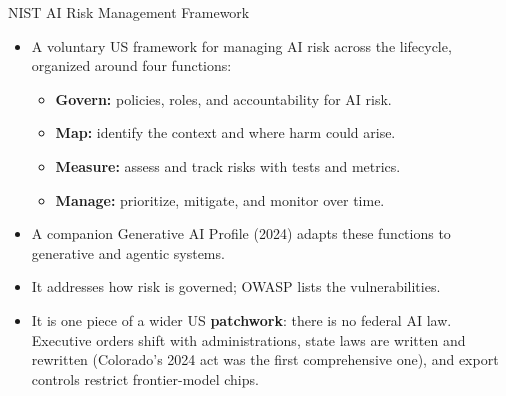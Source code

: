 \begin{frame}{NIST AI Risk Management Framework}
  \begin{itemize}\itemsep0.5em
    \item[\textcolor{KAred}{$\blacktriangleright$}] A voluntary US framework for managing AI risk across the lifecycle, organized around four functions:
      \begin{itemize}\itemsep0.25em
        \item \textbf{Govern:} policies, roles, and accountability for AI risk.
        \item \textbf{Map:} identify the context and where harm could arise.
        \item \textbf{Measure:} assess and track risks with tests and metrics.
        \item \textbf{Manage:} prioritize, mitigate, and monitor over time.
      \end{itemize}
    \item[\textcolor{KAred}{$\blacktriangleright$}] A companion Generative AI Profile (2024) adapts these functions to generative and agentic systems.
    \item[\textcolor{KAred}{$\blacktriangleright$}] It addresses how risk is governed; OWASP lists the vulnerabilities.
    \item[\textcolor{KAred}{$\blacktriangleright$}] It is one piece of a wider US \textbf{patchwork}: there is no federal AI law. Executive orders shift with administrations, state laws are written and rewritten (Colorado's 2024 act was the first comprehensive one), and export controls restrict frontier-model chips.
  \end{itemize}
\end{frame}

